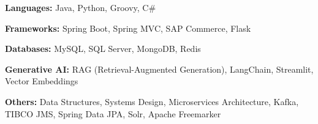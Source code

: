 
\begin{cvskills}

  \cvskill
    {\bf Languages:} %
    { Java, Python, Groovy, C\#}

  \cvskill
    {\bf Frameworks:} %
    {Spring Boot, Spring MVC, SAP Commerce, Flask}
    

\cvskill
    {\bf Databases:} %
    {MySQL, SQL Server, MongoDB, Redis}

  
  \cvskill
    {\bf Generative AI:} %
    {RAG (Retrieval-Augmented Generation), LangChain, Streamlit, Vector Embeddings}

\cvskill
    {\bf Others:} %
    {Data Structures, Systems Design, Microservices Architecture, Kafka, TIBCO JMS, Spring Data JPA, \newline Solr, Apache Freemarker}




\end{cvskills}

